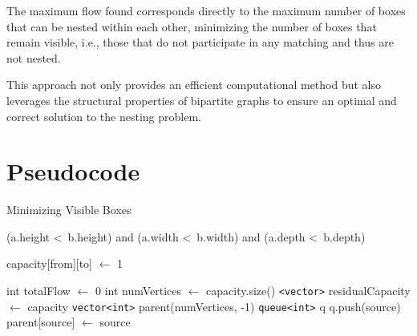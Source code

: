 \documentclass{article}
\begin{document}
        The maximum flow found corresponds directly to the maximum number of boxes that can be nested within each other, minimizing the number of boxes that remain visible, i.e., those that do not participate in any matching and thus are not nested.
        
        This approach not only provides an efficient computational method but also leverages the structural properties of bipartite graphs to ensure an optimal and correct solution to the nesting problem.


\section{Pseudocode}

    \begin{algorithm}
    \caption{Minimizing Visible Boxes}
        \begin{algorithmic}[1]
        
                \State \Return (a.height \textless\ b.height) and (a.width \textless\ b.width) and (a.depth \textless\ b.depth) 
            \EndFunction

        \vspace{0.5cm}

                \State capacity[from][to] $\gets$ 1  
            \EndFunction

        \vspace{0.5cm}

                \State int totalFlow $\gets$ 0  
                \State int numVertices $\gets$ capacity.size()  
                \State \texttt{<vector>} residualCapacity $\gets$ capacity 
                 
                    \State \texttt{vector<int>} parent(numVertices, -1)  
                    \State \texttt{queue<int>} q  
                    \State q.push(source)
                    \State parent[source] $\gets$ source  
        

\end{algorithmic}
\end{algorithm}
\end{document}
